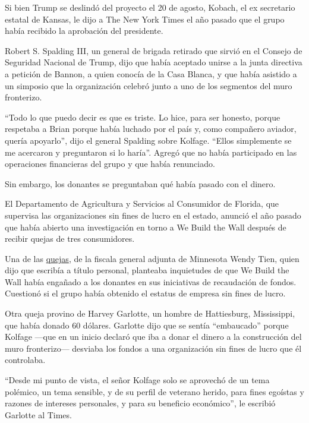 Si bien Trump se deslindó del proyecto el 20 de agosto, Kobach, el ex
secretario estatal de Kansas, le dijo a The New York Times el año pasado
que el grupo había recibido la aprobación del presidente.

Robert S. Spalding III, un general de brigada retirado que sirvió en el
Consejo de Seguridad Nacional de Trump, dijo que había aceptado unirse a
la junta directiva a petición de Bannon, a quien conocía de la Casa
Blanca, y que había asistido a un simposio que la organización celebró
junto a uno de los segmentos del muro fronterizo.

``Todo lo que puedo decir es que es triste. Lo hice, para ser honesto,
porque respetaba a Brian porque había luchado por el país y, como
compañero aviador, quería apoyarlo'', dijo el general Spalding sobre
Kolfage. ``Ellos simplemente se me acercaron y preguntaron si lo
haría''. Agregó que no había participado en las operaciones financieras
del grupo y que había renunciado.

Sin embargo, los donantes se preguntaban qué había pasado con el dinero.

El Departamento de Agricultura y Servicios al Consumidor de Florida, que
supervisa las organizaciones sin fines de lucro en el estado, anunció el
año pasado que había abierto una investigación en torno a We Build the
Wall después de recibir quejas de tres consumidores.

Una de las
\href{https://int.graylady3jvrrxbe.onion/data/documenttools/brian-kolfage-attorney-general-complaints/df78880e5adbc9fb/full.pdf}{quejas},
de la fiscala general adjunta de Minnesota Wendy Tien, quien dijo que
escribía a título personal, planteaba inquietudes de que We Build the
Wall había engañado a los donantes en sus iniciativas de recaudación de
fondos. Cuestionó si el grupo había obtenido el estatus de empresa sin
fines de lucro.

Otra queja provino de Harvey Garlotte, un hombre de Hattiesburg,
Mississippi, que había donado 60 dólares. Garlotte dijo que se sentía
``embaucado'' porque Kolfage ---que en un inicio declaró que iba a donar
el dinero a la construcción del muro fronterizo--- desviaba los fondos a
una organización sin fines de lucro que él controlaba.

``Desde mi punto de vista, el señor Kolfage solo se aprovechó de un tema
polémico, un tema sensible, y de su perfil de veterano herido, para
fines egoístas y razones de intereses personales, y para su beneficio
económico'', le escribió Garlotte al Times.

